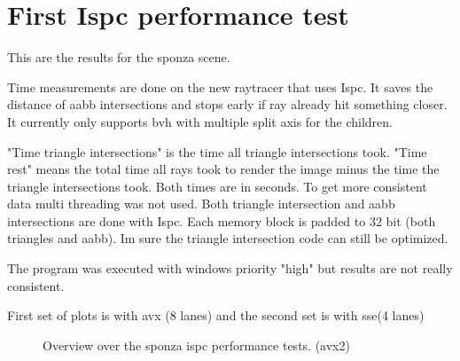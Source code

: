 
\section{First Ispc performance test}

This are the results for the sponza scene. 

Time measurements are done on the new raytracer that uses Ispc. It saves the distance of aabb intersections and stops early if ray already hit something closer. It currently only supports bvh with multiple split axis for the children.

"Time triangle intersections" is the time all triangle intersections took. "Time rest" means the total time all rays took to render the image minus the time the triangle intersections took. Both times are in seconds. To get more consistent data multi threading was not used. Both triangle intersection and aabb intersections are done with Ispc. Each memory block is padded to 32 bit (both triangles and aabb). Im sure the triangle intersection code can still be optimized.

The program was executed with windows priority "high" but results are not really consistent.

First set of plots is with avx (8 lanes) and the second set is with sse(4 lanes)

\iftrue
\begin{figure}[!htb]
	\begin{minipage}[t]{0.4\textwidth} 
	\end{minipage}\hfil \hfil
	\begin{minipage}[t]{0.4\textwidth}
	\end{minipage}
	
	\caption{Overview over the sponza ispc performance tests. (avx2)}
\end{figure}
\newpage
\fi


